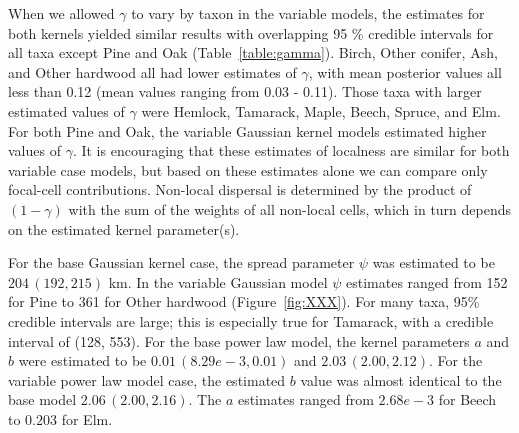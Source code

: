 \documentclass[12pt]{article}
\begin{document}
When we allowed $\gamma$ to vary by taxon in the variable models, the
estimates for both kernels yielded similar results with overlapping 95
\% credible intervals for all taxa except Pine and Oak
(Table~\ref{table:gamma}). Birch, Other conifer, Ash, and Other
hardwood all had lower estimates of $\gamma$, with mean posterior
values all less than 0.12 (mean values ranging from 0.03 -
0.11). Those taxa with larger estimated values of $\gamma$ were
Hemlock, Tamarack, Maple, Beech, Spruce, and Elm. For both Pine and
Oak, the variable Gaussian kernel models estimated higher values of
$\gamma$. It is encouraging that these estimates of localness are
similar for both variable case models, but based on these estimates
alone we can compare only focal-cell contributions. Non-local
dispersal is determined by the product of $(1-\gamma)$ with the sum of
the weights of all non-local cells, which in turn depends on the
estimated kernel parameter(s).

For the base Gaussian kernel case, the spread parameter $\psi$ was
estimated to be $204\,(192, 215)$ km. In the variable Gaussian model
$\psi$ estimates ranged from 152 for Pine to 361 for Other hardwood
(Figure~\ref{fig:XXX}). For many taxa, 95\% credible intervals are large;
this is especially true for Tamarack, with a credible interval of
(128, 553). For the base power law model, the kernel parameters $a$
and $b$ were estimated to be $0.01\,(8.29e-3, 0.01)$ and $2.03\,(2.00,
2.12)$. For the variable power law model case, the estimated $b$ value
was almost identical to the base model $2.06\,(2.00, 2.16)$. The $a$
estimates ranged from $2.68e-3$ for Beech to $0.203$ for Elm.
\end{document}

